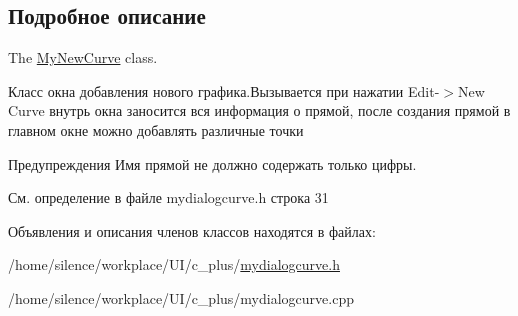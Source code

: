 \subsection{Подробное описание}
The \hyperlink{class_my_new_curve}{My\+New\+Curve} class. 

Класс окна добавления нового графика.\+Вызывается при нажатии Edit-\/$>$New Curve внутрь окна заносится вся информация о прямой, после создания прямой в главном окне можно добавлять различные точки \begin{DoxyWarning}{Предупреждения}
Имя прямой не должно содержать только цифры. 
\end{DoxyWarning}


См. определение в файле mydialogcurve.\+h строка 31



Объявления и описания членов классов находятся в файлах\+:\begin{DoxyCompactItemize}
\item 
/home/silence/workplace/\+U\+I/c\+\_\+plus/\hyperlink{mydialogcurve_8h}{mydialogcurve.\+h}\item 
/home/silence/workplace/\+U\+I/c\+\_\+plus/mydialogcurve.\+cpp\end{DoxyCompactItemize}
